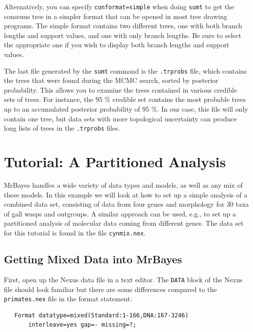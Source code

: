 \documentclass[12pt]{book}
\newcommand{\ttt}[1]{\texttt{#1}}
\begin{document}
Alternatively, you can specify \ttt{conformat=simple} when doing \ttt{sumt} to get the consenus
tree in a simpler format that can be opened in most tree drawing programs. The simple format
contains two different trees, one with both branch lengths and support values, and one with only
branch lengths. Be sure to select the appropriate one if you wish to display both branch lengths
and support values.

The last file generated by the \ttt{sumt} command is the \ttt{.trprobs} file, which contains the
trees that were found during the MCMC search, sorted by posterior probability. This allows you to
examine the trees contained in various credible sets of trees. For instance, the 95 \% credible set
contains the most probable trees up to an accumulated posterior probability of 95 \%. In our case,
this file will only contain one tree, but data sets with more topological uncertainty can produce
long lists of trees in the \ttt{.trprobs} files.

\chapter{Tutorial: A Partitioned Analysis}
\label{tutorialPartitioned}
MrBayes handles a wide variety of data types and models, as well as any mix of these models. In
this example we will look at how to set up a simple analysis of a combined data set, consisting of
data from four genes and morphology for 30 taxa of gall wasps and outgroups. A similar approach can
be used, e.g., to set up a partitioned analysis of molecular data coming from different genes. The
data set for this tutorial is found in the file \ttt{cynmix.nex}.

\section{Getting Mixed Data into MrBayes}

First, open up the Nexus data file in a text editor. The \ttt{DATA} block of the Nexus file should
look familiar but there are some differences compared to the \ttt{primates.nex} file in the format
statement:

\begin{singlespacing}
\footnotesize
\begin{verbatim}
   Format datatype=mixed(Standard:1-166,DNA:167-3246)
       interleave=yes gap=- missing=?;
\end{verbatim}
\normalsize
\end{singlespacing}
\end{document}
